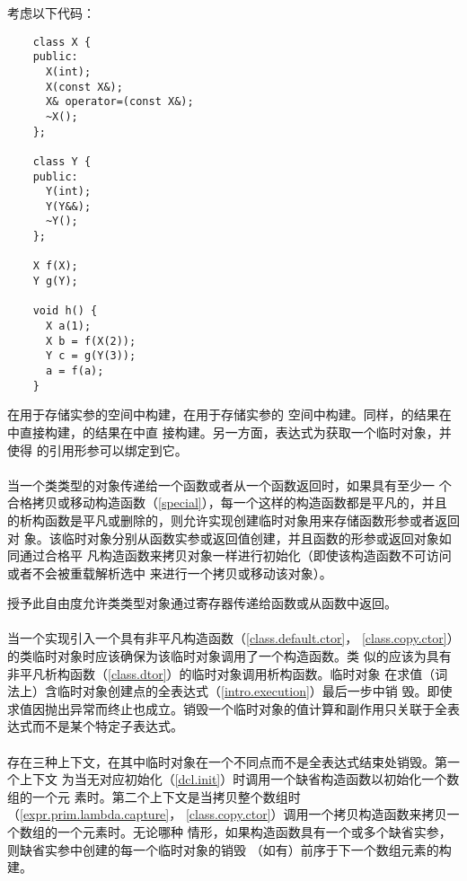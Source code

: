 \begin{example}
  考虑以下代码：
  \begin{lstlisting}
    class X {
    public:
      X(int);
      X(const X&);
      X& operator=(const X&);
      ~X();
    };

    class Y {
    public:
      Y(int);
      Y(Y&&);
      ~Y();
    };

    X f(X);
    Y g(Y);

    void h() {
      X a(1);
      X b = f(X(2));
      Y c = g(Y(3));
      a = f(a);
    }
  \end{lstlisting}
  在用于存储实参的空间中构建，在用于存储实参的
  空间中构建。同样，的结果在中直接构建，的结果在中直
  接构建。另一方面，表达式为获取一个临时对象，并\mat{}使得
  的引用形参可以绑定到它。
\end{example}

\paragraph{} %
当一个类类型的对象传递给一个函数或者从一个函数返回时，如果具有至少一
个合格拷贝或移动构造函数（\ref{special}），每一个这样的构造函数都是平凡的，并且
的析构函数是平凡或删除的，则允许实现创建临时对象用来存储函数形参或者返回对
象。该临时对象分别从函数实参或返回值创建，并且函数的形参或返回对象如同通过合格平
凡构造函数来拷贝对象一样进行初始化（即使该构造函数不可访问或者不会被重载解析选中
来进行一个拷贝或移动该对象）。

\begin{note}
  授予此自由度允许类类型对象通过寄存器传递给函数或从函数中返回。
\end{note}

\paragraph{} %
当一个实现引入一个具有非平凡构造函数（\ref{class.default.ctor}，
\ref{class.copy.ctor}）的类临时对象时应该确保为该临时对象调用了一个构造函数。类
似的应该为具有非平凡析构函数（\ref{class.dtor}）的临时对象调用析构函数。临时对象
在求值（词法上）含临时对象创建点的全表达式（\ref{intro.execution}）最后一步中销
毁。即使求值因抛出异常而终止也成立。销毁一个临时对象的值计算和副作用只关联于全表
达式而不是某个特定子表达式。

\paragraph{} %
存在三种上下文，在其中临时对象在一个不同点而不是全表达式结束处销毁。第一个上下文
为当无对应初始化（\ref{dcl.init}）时调用一个缺省构造函数以初始化一个数组的一个元
素时。第二个上下文是当拷贝整个数组时（\ref{expr.prim.lambda.capture}，
\ref{class.copy.ctor}）调用一个拷贝构造函数来拷贝一个数组的一个元素时。无论哪种
情形，如果构造函数具有一个或多个缺省实参，则缺省实参中创建的每一个临时对象的销毁
（如有）前序于下一个数组元素的构建。


